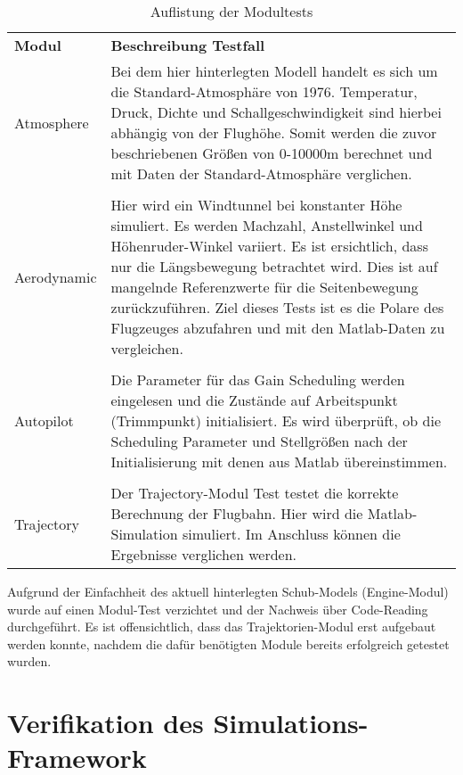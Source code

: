 \begin{table}[h]
\centering	\begin{tabular}{l p{12cm}}
		\textbf{Modul} & \textbf{Beschreibung Testfall}\\
		Atmosphere & Bei dem hier hinterlegten Modell  handelt es sich um die Standard-Atmosphäre von 1976.  Temperatur, Druck, Dichte und Schallgeschwindigkeit sind hierbei abhängig von der Flughöhe. Somit werden die zuvor beschriebenen Größen von 0-10000m berechnet und mit Daten der Standard-Atmosphäre verglichen.\\\\
		Aerodynamic & Hier wird ein Windtunnel bei konstanter Höhe simuliert. Es werden Machzahl, Anstellwinkel und Höhenruder-Winkel variiert. Es ist ersichtlich, dass nur die Längsbewegung betrachtet wird. Dies ist auf mangelnde Referenzwerte für die Seitenbewegung zurückzuführen. Ziel dieses Tests ist es die Polare des Flugzeuges abzufahren und mit den Matlab-Daten zu vergleichen. \\\\
		Autopilot &  Die Parameter für das Gain Scheduling werden eingelesen und die Zustände auf Arbeitspunkt (Trimmpunkt) initialisiert. Es wird überprüft, ob die Scheduling Parameter und Stellgrößen nach der Initialisierung mit denen aus Matlab übereinstimmen.\\\\
		Trajectory & Der Trajectory-Modul Test testet die korrekte Berechnung der Flugbahn. Hier wird die Matlab-Simulation simuliert. Im Anschluss können die Ergebnisse verglichen werden.
	\end{tabular}
\label{tab:modultests}
\caption{Auflistung der Modultests}
\end{table}
\newpage
Aufgrund der Einfachheit des aktuell hinterlegten Schub-Models (Engine-Modul) wurde auf einen Modul-Test verzichtet und der Nachweis über Code-Reading durchgeführt.
Es ist offensichtlich, dass das Trajektorien-Modul erst aufgebaut werden konnte, nachdem die dafür benötigten Module bereits erfolgreich getestet wurden.


\section{Verifikation des Simulations-Framework}
